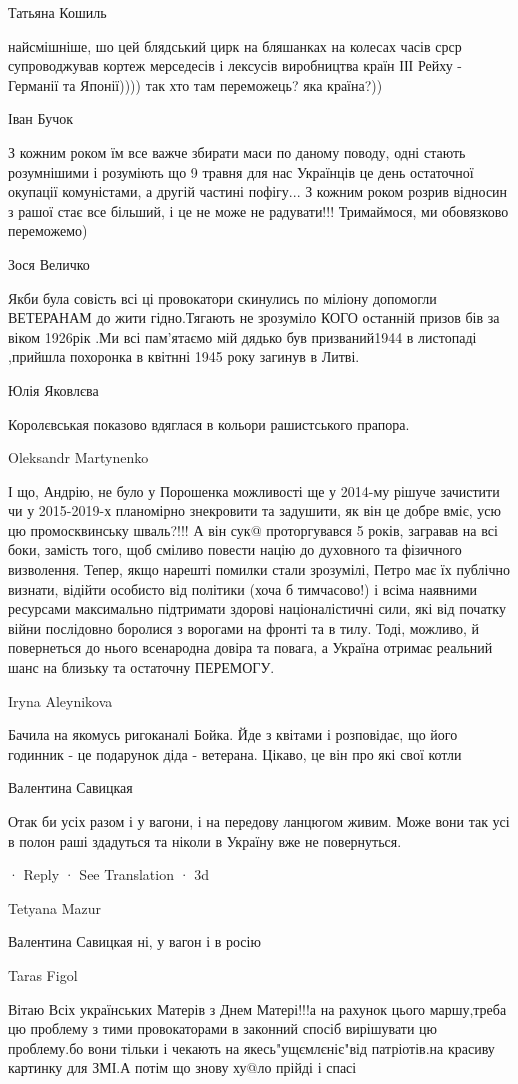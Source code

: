 Татьяна Кошиль

найсмішніше, шо цей блядський цирк на бляшанках на колесах часів срср
супроводжував кортеж мерседесів і лексусів виробництва країн ІІІ Рейху -
Германії та Японії)))) так хто там переможець? яка країна?))

Іван Бучок

З кожним роком їм все важче збирати маси по даному поводу, одні стають
розумнішими і розуміють що 9 травня для нас Українців це день остаточної
окупації комуністами, а другій частині пофігу... З кожним роком розрив відносин
з рашої стає все більший, і це не може не радувати!!! Тримаймося, ми обовязково
переможемо)

Зося Величко

Якби була совість всі ці провокатори скинулись по міліону допомогли ВЕТЕРАНАМ
до жити гідно.Тягають не зрозуміло КОГО останній призов бів за віком 1926рік
.Ми всі пам'ятаємо мій дядько був призваний1944 в листопаді ,прийшла похоронка
в квітнні 1945 року загинув в Литві.

Юлія Яковлєва

Королєвськая показово вдяглася в кольори рашистського прапора.

Oleksandr Martynenko

І що, Андрію, не було у Порошенка можливості ще у 2014-му рішуче зачистити чи у
2015-2019-х планомірно знекровити та задушити, як він це добре вміє, усю цю
промосквинську шваль?!!! А він сук@ проторгувався 5 років, загравав на всі
боки, замість того, щоб сміливо повести націю до духовного та фізичного
визволення. Тепер, якщо нарешті помилки стали зрозумілі, Петро має їх публічно
визнати, відійти особисто від політики (хоча б тимчасово!) і всіма наявними
ресурсами максимально підтримати здорові націоналістичні сили, які від початку
війни послідовно боролися з ворогами на фронті та в тилу. Тоді, можливо, й
повернеться до нього всенародна довіра та повага, а Україна отримає реальний
шанс на близьку та остаточну ПЕРЕМОГУ.

Iryna Aleynikova

Бачила на якомусь ригоканалі Бойка. Йде з квітами і розповідає, що його
годинник - це подарунок діда - ветерана. Цікаво, це він про які свої котли

Валентина Савицкая

Отак би усіх разом і у вагони, і на передову ланцюгом живим. Може вони так усі
в полон раші здадуться та ніколи в Україну вже не повернуться.

 · Reply · See Translation · 3d

Tetyana Mazur

Валентина Савицкая ні, у вагон і в росію

Taras Figol

Вітаю Всіх українських Матерів з Днем Матері!!!а на рахунок цього маршу,треба цю проблему з тими провокаторами в законний спосіб вирішувати цю проблему.бо вони тільки і чекають на якесь"ущємлєніє"від патріотів.на красиву картинку для ЗМІ.А потім що знову ху@ло прійді і спасі
